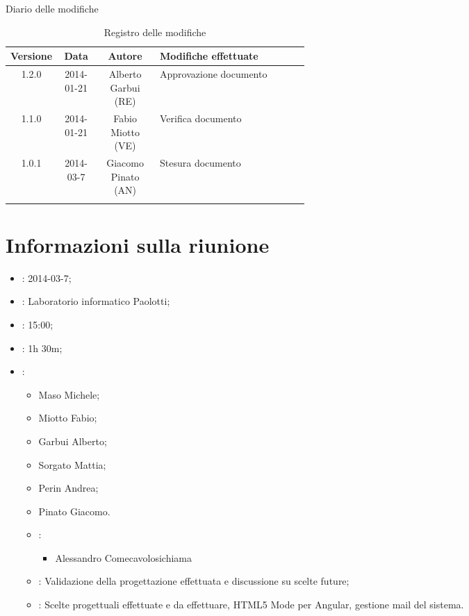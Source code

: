 
\newpage
Diario delle modifiche
\begin{center}
\begin{longtable}{|c|c|c|p{0.5\linewidth}|}
\toprule
\textbf{Versione} & \textbf{Data} & \textbf{Autore} & \textbf{Modifiche effettuate}\\

\midrule
1.2.0 & 2014-01-21 & Alberto Garbui (RE)  & Approvazione documento\\
\midrule
1.1.0 & 2014-01-21 & Fabio Miotto (VE) & Verifica documento\\
\midrule
1.0.1 & 2014-03-7 & Giacomo Pinato (AN) & Stesura documento\\

\bottomrule
\caption{Registro delle modifiche}
\label{tab:changelog}
\end{longtable}
\end{center}

\newpage
\tableofcontents


\newpage
\section{Informazioni sulla riunione}%
\label{1.0}
\begin{itemize}
\item {}: 2014-03-7;
\item {}: Laboratorio informatico Paolotti;
\item {}: 15:00;
\item {}: 1h 30m;
\item {}: \NomeGruppo{}
\begin{itemize}
\item Maso Michele;
\item Miotto Fabio;
\item Garbui Alberto;
\item Sorgato Mattia;
\item Perin Andrea;
\item Pinato Giacomo.
\item {}:
\begin{itemize}
\item Alessandro Comecavolosichiama
\end{itemize}
\item {}: Validazione della progettazione effettuata e discussione su scelte future;
\item {}: Scelte progettuali effettuate e da effettuare, HTML5 Mode per Angular, gestione mail del sistema.
\end{itemize}
\end{itemize}

